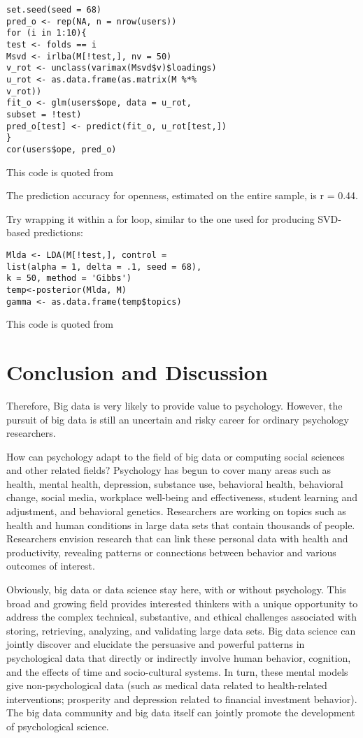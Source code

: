 \begin{verbatim}
set.seed(seed = 68)
pred_o <- rep(NA, n = nrow(users))
for (i in 1:10){
test <- folds == i
Msvd <- irlba(M[!test,], nv = 50)
v_rot <- unclass(varimax(Msvd$v)$loadings)
u_rot <- as.data.frame(as.matrix(M %*%
v_rot))
fit_o <- glm(users$ope, data = u_rot,
subset = !test)
pred_o[test] <- predict(fit_o, u_rot[test,])
}
cor(users$ope, pred_o)
\end{verbatim}

This code is quoted from~\cite{editor12}

The prediction accuracy for openness, estimated on the entire
sample, is r = 0.44.

Try wrapping it within a for loop, similar to the one used for 
producing SVD-based predictions:

\begin{verbatim}
Mlda <- LDA(M[!test,], control =
list(alpha = 1, delta = .1, seed = 68),
k = 50, method = 'Gibbs')
temp<-posterior(Mlda, M)
gamma <- as.data.frame(temp$topics)
\end{verbatim}

This code is quoted from~\cite{editor12}

\section{Conclusion and Discussion}

Therefore, Big data is very likely to provide value to psychology.
 However, the pursuit of big data is still an uncertain and risky 
career for ordinary psychology researchers.

How can psychology adapt to the field of big data or computing 
social sciences and other related fields? Psychology has begun to 
cover many areas such as health, mental health, depression, 
substance use, behavioral health, behavioral change, social media,
 workplace well-being and effectiveness, student learning and 
adjustment, and behavioral genetics. Researchers are working on 
topics such as health and human conditions in large data sets that
 contain thousands of people. Researchers envision research that 
can link these personal data with health and productivity, 
revealing patterns or connections between behavior and various 
outcomes of interest.

Obviously, big data or data science stay here, with or without 
psychology. This broad and growing field provides interested 
thinkers with a unique opportunity to address the complex 
technical, substantive, and ethical challenges associated with 
storing, retrieving, analyzing, and validating large data sets. 
Big data science can jointly discover and elucidate the persuasive
 and powerful patterns in psychological data that directly or 
indirectly involve human behavior, cognition, and the effects of 
time and socio-cultural systems. In turn, these mental models give
 non-psychological data (such as medical data related to 
health-related interventions; prosperity and depression related to
 financial investment behavior). The big data community and big 
data itself can jointly promote the development of psychological 
science.



